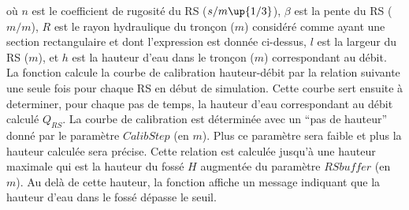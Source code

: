 

où $n$ est le coefficient de rugosité du RS ($s/m\up{1/3}$), $\beta$ est la pente du RS ($m/m$), $R$ est le rayon hydraulique du tronçon ($m$) considéré comme ayant une section rectangulaire et dont l'expression est donnée ci-dessus, $l$ est la largeur du RS ($m$), et $h$ est la hauteur d'eau dans le tronçon ($m$) correspondant au débit.\\

La fonction calcule la courbe de calibration hauteur-débit par la relation suivante une seule fois pour chaque RS en début de simulation. Cette courbe sert ensuite à determiner, pour chaque pas de temps, la hauteur d'eau correspondant au débit calculé $Q_{RS}$. La courbe de calibration est déterminée avec un ``pas de hauteur'' donné par le paramètre $Calib Step$ (en $m$). Plus ce paramètre sera faible et plus la hauteur calculée sera précise. Cette relation est calculée jusqu'à une hauteur maximale qui est la hauteur du fossé $H$ augmentée du paramètre $RS buffer$ (en $m$). Au delà de cette hauteur, la fonction affiche un message indiquant que la hauteur d'eau dans le fossé dépasse le seuil.\\

